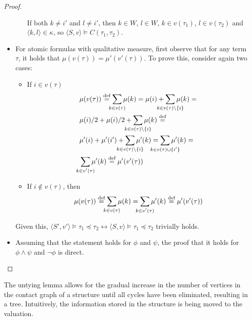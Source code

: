 \documentclass{article}
\newcommand{\lcont}{C}
\newcommand{\lmeasure}{\preceq}
\newcommand{\eqdef}{\stackrel{\text{def}}{=}}
\begin{document}
\begin{proof}
\begin{itemize}
\begin{itemize}
      If both $k \neq i'$ and $l \neq i'$, then $k \in W$, $l \in W$, $k \in v(\tau_1)$, $l \in v(\tau_2)$ and $\langle k, l \rangle \in \kappa$, so $\langle S, v \rangle \models \lcont(\tau_1, \tau_2)$.
    \end{itemize}
  \item For atomic formulas with qualitative measure, first observe that for any term $\tau$, it holds that $\mu(v(\tau)) = \mu'(v'(\tau))$. To prove this, consider again two cases:
    \begin{itemize}
    \item If $i \in v(\tau)$
      \begin{align*}
        & \mu(v(\tau)) \eqdef \sum_{\mathclap{k \in v(\tau)}}\mu(k) = \mu(i) + \sum_{\mathclap{k \in v(\tau) \setminus \{i\}}}\mu(k) = \\
        & \mu(i) / 2 + \mu(i) / 2 + \sum_{\mathclap{k \in v(\tau) \setminus \{i\}}}\mu(k) \eqdef \\
        & \mu'(i) + \mu'(i') + \sum_{\mathclap{k \in v(\tau) \setminus \{i\}}}\mu'(k) = \sum_{\mathclap{k \in v(\tau) \cup \{i'\}}}\mu'(k) = \\
        & \sum_{\mathclap{k \in v'(\tau)}}\mu'(k) \eqdef \mu'(v'(\tau))
      \end{align*}
    \item If $i \not \in v(\tau)$, then
      \begin{equation*}
        \mu(v(\tau)) \eqdef \sum_{\mathclap{k \in v(\tau)}}\mu(k) = \sum_{\mathclap{k \in v'(\tau)}}\mu'(k) \eqdef \mu'(v'(\tau))
      \end{equation*}
    \end{itemize}
    Given this, $\langle S', v' \rangle \models \tau_1 \lmeasure \tau_2 \leftrightarrow \langle S, v \rangle \models \tau_1 \lmeasure \tau_2$ trivially holds.
  \item Assuming that the statement holds for $\phi$ and $\psi$, the proof that it holds for $\phi \land \psi$ and $\lnot \phi$ is direct.
\end{itemize}
\end{proof}

The untying lemma allows for the gradual increase in the number of vertices in the contact graph of a structure until all cycles have been eliminated, resulting in a tree. Intuitively, the information stored in the structure is being moved to the valuation.
\end{document}
